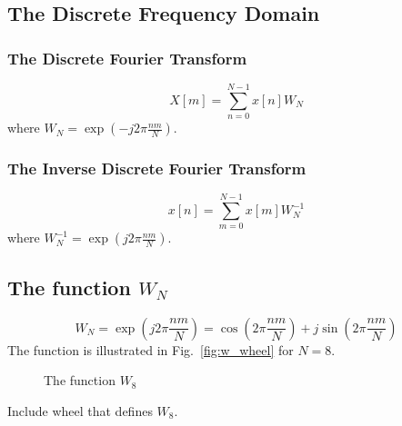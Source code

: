 
\subsection*{The Discrete Frequency Domain}

\subsubsection*{The Discrete Fourier Transform}

$$
X[m] = \sum_{n=0}^{N-1} x[n] W_N
$$
where $W_N = \exp(-j2\pi\frac{nm}{N})$.

\subsubsection*{The Inverse Discrete Fourier Transform}

$$
x[n] = \sum_{m=0}^{N-1}  x[m]W_N^{-1}
$$
where $W_N^{-1}=\exp(j2\pi\frac{nm}{N})$.

\subsection*{The function $W_N$}

$$
W_N = \exp\left(j2\pi\frac{nm}{N}\right) %
     = \cos\left(2\pi\frac{nm}{N}\right)+j\sin\left(2\pi\frac{nm}{N}\right)
$$
The function is illustrated in Fig.~\ref{fig:w_wheel} for $N = 8$.

\begin{center}
    \begin{figure}[hbt]
    \caption{\label{ig:w_wheel} The function $W_8$}
    \end{figure}
\end{center}
Include wheel that defines $W_8$.

\endinput
